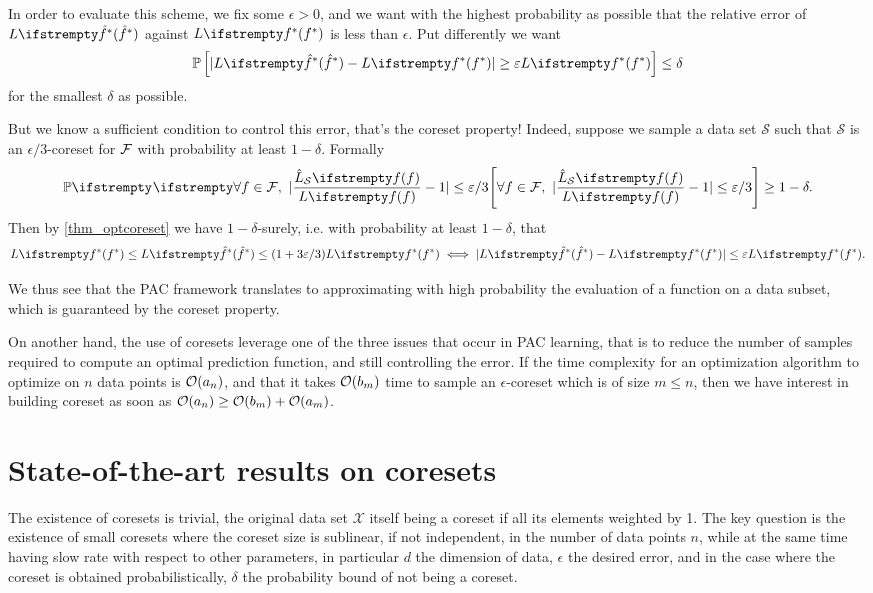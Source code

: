 In order to evaluate this scheme, we fix some $\epsilon>0$, and we want with the highest probability as possible that the relative error of $\loss{\hat\query^*}$ against $\loss{\query^*}$ is less than $\epsilon$. Put differently we want
\begin{equation*}
	\mathbb{P}\left[|\loss{\hat\query^*} - \loss{\query^*}| \ge \epsilon \loss{\query^*}\right] \leq \delta
\end{equation*}
for the smallest $\delta$ as possible.

But we know a sufficient condition to control this error, that's the coreset property! Indeed, suppose we sample a data set $\mathcal{S}$ such that $\mathcal{S}$ is an $\epsilon/3$-coreset for $\mathcal{F}$ with probability at least $1-\delta$. Formally
\begin{equation*}
    \PP{}{\forall f \in \qset,\ |\frac{\estloss{\mathcal{S}}{\query}}{\loss{\query}} - 1| \leq \epsilon/3} \geq 1- \delta.
\end{equation*}
Then by \cref{thm_optcoreset} we have $1-\delta$-surely, i.e. with probability at least $1-\delta$, that
\begin{equation*}
    \loss{\query^*} \leq \loss{\hat\query^*} \leq (1+ 3 \epsilon/3) \loss{\query^*} \iff
    |\loss{\hat\query^*} - \loss{\query^*}| \leq \epsilon \loss{\query^*}.
\end{equation*}

We thus see that the PAC framework translates to approximating with high probability the evaluation of a function on a data subset, which is guaranteed by the coreset property. 

On another hand, the use of coresets leverage one of the three issues that occur in PAC learning, that is to reduce the number of samples required to compute an optimal prediction function, and still controlling the error. If the time complexity for an optimization algorithm to optimize on $n$ data points is $\mathcal{O}(a_n)$, and that it takes $\mathcal{O}(b_m)$ time to sample an $\epsilon$-coreset which is of size $m \le n$, then we have interest in building coreset as soon as $\mathcal{O}(a_n) \geq \mathcal{O}(b_m) + \mathcal{O}(a_m)$.





    

\section{State-of-the-art results on coresets}
The existence of coresets is trivial, the original data set $\mathcal{X}$ itself  being a coreset if all its elements weighted by 1. The key question is the existence of small coresets where the coreset size is sublinear, if not independent, in the number of data points $n$, while at the same time having slow rate with respect to other parameters, in particular $d$ the dimension of data, $\epsilon$ the desired error, and in the case where the coreset is obtained probabilistically, $\delta$ the probability bound of not being a coreset.

